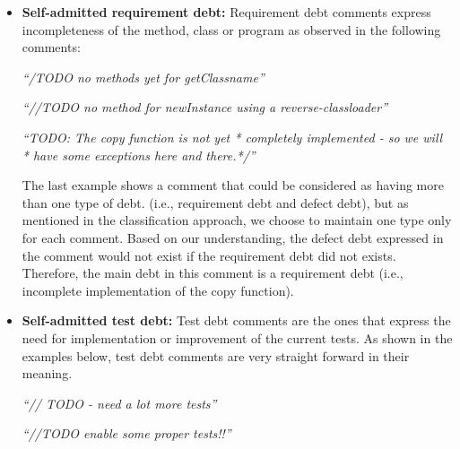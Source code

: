 \begin{itemize}
  \item \textbf{Self-admitted requirement debt:} Requirement debt comments express incompleteness of the method, class or program as observed in the following comments:
  
  \begin{displayquote}
  	\textit{``/TODO no methods yet for getClassname''}
  	
  	\vspace{1mm}
  	
  	\textit{``//TODO no method for newInstance using a reverse-classloader''}

  	\vspace{1mm}
  	
  	\textit{``TODO: The copy function is not yet * completely implemented - so we will  * have some exceptions here and there.*/''}  
  	
  \end{displayquote}
  \vspace{1mm}  
  
The last example shows a comment that could be considered as having more than one type of debt. (i.e., requirement debt and defect debt), but as mentioned in the classification approach, we choose to maintain one type only for each comment. Based on our understanding, the defect debt expressed in the comment would not exist if the requirement debt did not exists. Therefore, the main debt in this comment is a requirement debt (i.e., incomplete implementation of the copy function). 
  	
  
  \vspace{1mm}
  \item \textbf{Self-admitted test debt:} Test debt comments are the ones that express the need for implementation or improvement of the current tests. As shown in the examples below, test debt comments are very straight forward in their meaning. 
  
  \begin{displayquote}
  	\textit{``// TODO - need a lot more tests''}
  	
  	\vspace{1mm}
  	
  	\textit{``//TODO enable some proper tests!!''}
  \end{displayquote}
  \vspace{1mm}  
    
\end{itemize}

